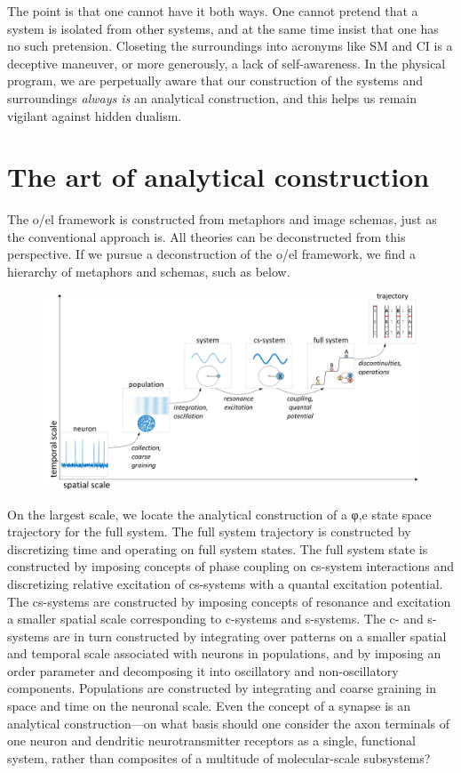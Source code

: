   The point is that one cannot have it both ways. One cannot pretend that a system is isolated from other systems, and at the same time insist that one has no such pretension. Closeting the surroundings into acronyms like SM and CI is a deceptive maneuver, or more generously, a lack of self-awareness. In the physical program, we are perpetually aware that our construction of the systems and surroundings \textit{always is} an analytical construction, and this helps us remain vigilant against hidden dualism.

\section{The art of analytical construction}

The o/el framework is constructed from metaphors and image schemas, just as the conventional approach is. All theories can be deconstructed from this perspective. If we pursue a deconstruction of the o/el framework, we find a hierarchy of metaphors and schemas, such as below. 

  
\begin{figure}
\includegraphics[width=\textwidth]{figures/Tilsen-img169.png}
\caption{\missingcaption}
\label{fig:8:3}
\end{figure}
 

  On the largest scale, we locate the analytical construction of a φ,e state space trajectory for the full system. The full system trajectory is constructed by discretizing time and operating on full system states. The full system state is constructed by imposing concepts of phase coupling on cs-system interactions and discretizing relative excitation of cs-systems with a quantal excitation potential. The cs-systems are constructed by imposing concepts of resonance and excitation a smaller spatial scale corresponding to c-systems and s-systems. The c- and s-systems are in turn constructed by integrating over patterns on a smaller spatial and temporal scale associated with neurons in populations, and by imposing an order parameter and decomposing it into oscillatory and non-oscillatory components. Populations are constructed by integrating and coarse graining in space and time on the neuronal scale. Even the concept of a synapse is an analytical construction—on what basis should one consider the axon terminals of one neuron and dendritic neurotransmitter receptors as a single, functional system, rather than composites of a multitude of molecular-scale subsystems? 

